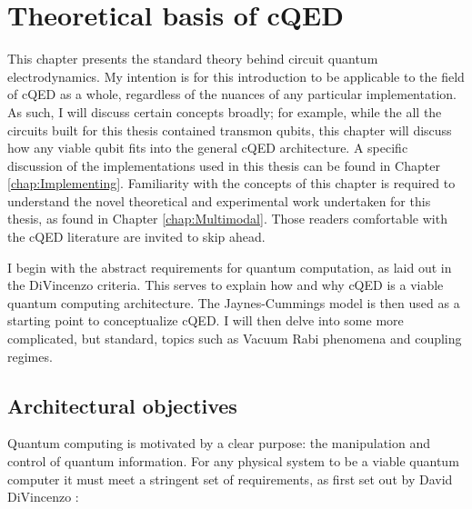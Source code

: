 \documentclass[12 pt]{book}
\begin{document}
\chapter{Theoretical basis of cQED}\label{chap:Theoretical}
This chapter presents the standard theory behind circuit quantum electrodynamics. My intention is for this introduction to be applicable to the field of cQED as a whole, regardless of the nuances of any particular implementation. As such, I will discuss certain concepts broadly; for example, while the all the circuits built for this thesis contained transmon qubits, this chapter will discuss how any viable qubit fits into the general cQED architecture. A specific discussion of the implementations used in this thesis can be found in Chapter \ref{chap:Implementing}. Familiarity with the concepts of this chapter is required to understand the novel theoretical and experimental work undertaken for this thesis, as found in Chapter \ref{chap:Multimodal}. Those readers comfortable with the cQED literature are invited to skip ahead. 

I begin with the abstract requirements for quantum computation, as laid out in the DiVincenzo criteria. This serves to explain how and why cQED is a viable quantum computing architecture. The Jaynes-Cummings model is then used as a starting point to conceptualize cQED. I will then delve into some more complicated, but standard, topics such as Vacuum Rabi phenomena and coupling regimes.

\section{Architectural objectives}\label{sec:DiVincenzo}
Quantum computing is motivated by a clear purpose: the manipulation and control of quantum information. For any physical system to be a viable quantum computer it must meet a stringent set of requirements, as first set out by David DiVincenzo \cite{DiVincenzo}:
\end{document}
